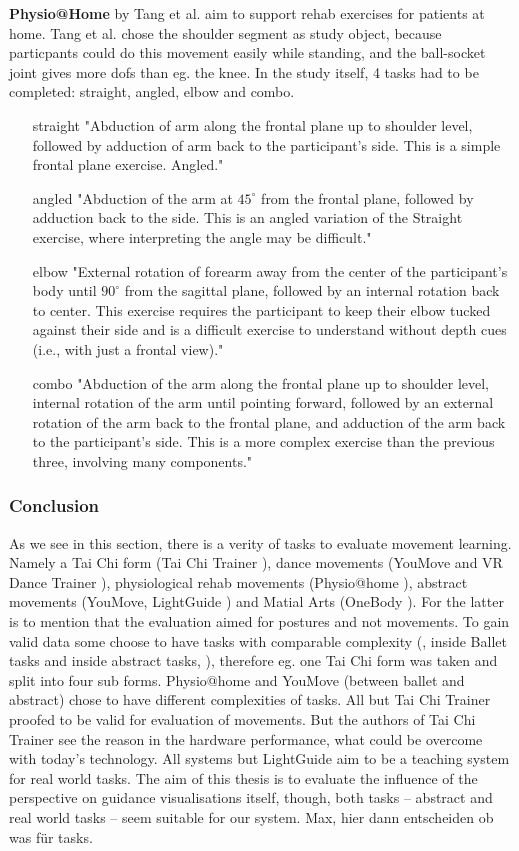 \textbf{Physio@Home} by Tang et al. \cite{Tang2015} aim to support rehab exercises for patients at home. Tang et al. chose the shoulder segment as study object, because particpants could do this movement easily while standing, and the ball-socket joint gives more dofs than eg. the knee. In the study itself, 4 tasks had to be completed: straight, angled, elbow and combo.
\begin{itemize}
	\item[straight] "Abduction of arm along the frontal plane up to shoulder level, followed by adduction of arm back to the participant’s side. This is a simple frontal plane exercise.
	Angled."
	\item[angled] "Abduction of the arm at $45^\circ$ from the frontal plane, followed by adduction back to the side. This is an angled variation of the Straight exercise, where interpreting the angle may be difficult."
	\item[elbow] "External rotation of forearm away from the center of the participant’s body until $90^\circ$ from the sagittal plane, followed by an internal rotation back to center. This exercise requires the participant to keep their elbow tucked against their side and is a difficult exercise to understand without depth cues (i.e., with just a frontal view)."
	\item[combo] "Abduction of the arm along the frontal plane up to shoulder level, internal rotation of the arm until pointing forward, followed by an external rotation of the arm back to the frontal plane, and adduction of the arm back to the participant’s side. This is a more complex exercise than the previous three, involving many components."
\end{itemize}

\subsubsection{Conclusion}
As we see in this section, there is a verity of tasks to evaluate movement learning. Namely a Tai Chi form (Tai Chi Trainer \cite{Chua}), dance movements (YouMove \cite{Anderson2013} and VR Dance Trainer \cite{Chan2011}), physiological rehab movements (Physio@home \cite{Tang2015}), abstract movements (YouMove, LightGuide \cite{Sodhi2012}) and Matial Arts (OneBody \cite{Hoang2016}). For the latter is to mention that the evaluation aimed for postures and not movements. To gain valid data some choose to have tasks with comparable complexity (\cite{Chua}, \cite{Anderson2013} inside Ballet tasks and inside abstract tasks, \cite{Sodhi2012}), therefore eg. one Tai Chi form was taken and split into four sub forms. Physio@home and YouMove (between ballet and abstract) chose to have different complexities of tasks. All but Tai Chi Trainer proofed to be valid for evaluation of movements. But the authors of Tai Chi Trainer see the reason in the hardware performance, what could be overcome with today's technology. All systems but LightGuide aim to be a teaching system for real world tasks. The aim of this thesis is to evaluate the influence of the perspective on guidance visualisations itself, though, both tasks \--- abstract and real world tasks \--- seem suitable for our system. Max, hier dann entscheiden ob was für tasks.

